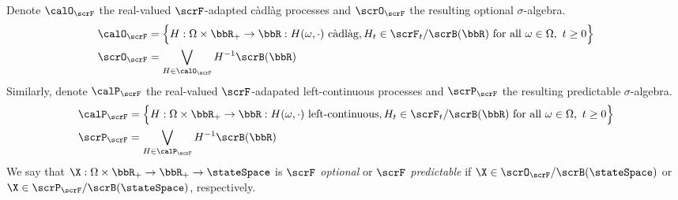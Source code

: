 \begin{definition}
  Denote $\calO_\scrF$ the real-valued $\scrF$-adapted c\`adl\`ag processes and $\scrO_\scrF$ the resulting optional $\sigma$-algebra.
  \begin{align*}
    \calO_\scrF &= \Big\{ H: \Omega \times \bbR_+ \rightarrow \bbR :  H(\omega,\cdot) \text{ c\`adl\`ag}, H_t \in \scrF_t/\scrB(\bbR) \text{ for all } \omega \in \Omega,~ t \geq0 \Big\} \\
    \scrO_\scrF &= \bigvee_{H \in \calO_\scrF} H^{-1}\scrB(\bbR)
  \end{align*}
  Similarly, denote $\calP_\scrF$ the real-valued $\scrF$-adapated left-continuous processes and $\scrP_\scrF$ the resulting predictable $\sigma$-algebra.
  \begin{align*}
    \calP_\scrF &= \Big\{ H: \Omega \times \bbR_+ \rightarrow \bbR :  H(\omega,\cdot) \text{ left-continuous}, H_t \in \scrF_t/\scrB(\bbR) \text{ for all } \omega \in \Omega,~ t \geq0 \Big\} \\
    \scrP_\scrF &= \bigvee_{H \in \calP_\scrF} H^{-1}\scrB(\bbR)
  \end{align*}
  We say that $\X: \Omega \times \bbR_+ \rightarrow \bbR_+ \rightarrow \stateSpace$ is \emph{$\scrF$ optional} or \emph{$\scrF$ predictable} if $\X \in \scrO_\scrF/\scrB(\stateSpace)$ or $\X \in \scrP_\scrF/\scrB(\stateSpace)$, respectively.
\end{definition}
